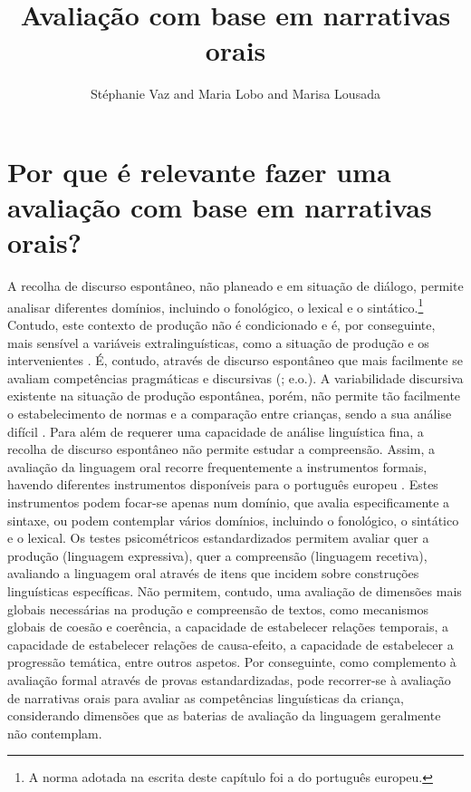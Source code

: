\documentclass[output=paper,colorlinks,citecolor=brown,booklanguage=portuguese]{langscibook}
\title{Avaliação com base em narrativas orais}
\author{Stéphanie Vaz\affiliation{Universidade Nova de Lisboa, Faculdade de Ciências Sociais e Humanas, CLUNL} and Maria Lobo\affiliation{Universidade Nova de Lisboa, Faculdade de Ciências Sociais e Humanas, CLUNL}  and  Marisa Lousada\affiliation{CINTESIS.UA, Escola Superior de Saúde, Universidade de Aveiro}}
\begin{document}
\maketitle

\section{Por que é relevante fazer uma avaliação com base em narrativas orais?}
A recolha de discurso espontâneo, não planeado e em situação de diálogo, permite analisar diferentes domínios, incluindo o fonológico, o lexical e o sintático.\footnote{A norma adotada na escrita deste capítulo foi a do português europeu.}
Contudo, este contexto de produção não é condicionado e é, por conseguinte, mais sensível a variáveis extralinguísticas, como a situação de produção e os intervenientes \citep{Demuth1996, Stromswold1996}. É, contudo, através de discurso espontâneo que mais facilmente se avaliam competências pragmáticas e discursivas (\citealp{Condouris2003}; e.o.). A variabilidade discursiva existente na situação de produção espontânea, porém, não permite tão facilmente o estabelecimento de normas e a comparação entre crianças, sendo a sua análise difícil \citep{Kover2014}. Para além de requerer uma capacidade de análise linguística fina, a recolha de discurso espontâneo não permite estudar a compreensão. Assim, a avaliação da linguagem oral recorre frequentemente a instrumentos formais, havendo diferentes instrumentos disponíveis para o português europeu \citep{Viana2017a}. Estes instrumentos podem focar-se apenas num domínio, que avalia especificamente a sintaxe, ou podem contemplar vários domínios, incluindo o fonológico, o sintático e o lexical. Os testes psicométricos estandardizados permitem avaliar quer a produção (linguagem expressiva), quer a compreensão (linguagem recetiva), avaliando a linguagem oral através de itens que incidem sobre construções linguísticas específicas. Não permitem, contudo, uma avaliação de dimensões mais globais necessárias na produção e compreensão de textos, como mecanismos globais de coesão e coerência, a capacidade de estabelecer relações temporais, a capacidade de estabelecer relações de causa-efeito, a capacidade de estabelecer a progressão temática, entre outros aspetos. Por conseguinte, como complemento à avaliação formal através de provas estandardizadas, pode recorrer-se à avaliação de narrativas orais para avaliar as competências linguísticas da criança, considerando dimensões que as baterias de avaliação da linguagem geralmente não contemplam.
\end{document}
